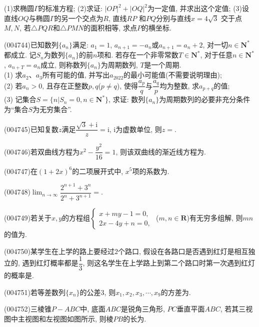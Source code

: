 (1)求椭圆$\Gamma$的标准方程;
(2)求证: ${{| OP |}^2}+{{| OQ |}^2}$为一定值, 并求出这个定值;
(3)设直线$OQ$与椭圆$\Gamma$的另一个交点为$R$, 直线$RP$ 和$PQ$分别与直线$x=4\sqrt 3$ 交于点$M,N$, 若$\triangle PQR$和$\triangle PMN$的面积相等, 求点$P$的横坐标.
\item (004744)已知数列$\{a_n\}$满足: $a_1=1$, $a_{n+1}=-a_n$或$a_{n+1}=a_n+2$, 对一切$n\in \mathbf{N}^*$都成立. 记$S_n$为数列$\{a_n\}$的前$n$项和. 若存在一个非零常数$T\in \mathbf{N}^*$, 对于任意$n\in \mathbf{N}^*$, $a_{n+T}={a_n}$成立, 则称数列$\{a_n\}$为周期数列, $T$是一个周期.\\
(1) 求$a_2$、$a_3$所有可能的值, 并写出$a_{2022}$的最小可能值(不需要说明理由);\\
(2) 若$a_n>0$, 且存在正整数$p,q$($p\ne q$), 使得$\dfrac{a_p}q$与$\dfrac{a_q}p$均为整数, 求$a_{p+q}$的值;\\
(3) 记集合$S=\{n|S_n=0,n\in \mathbf{N}^*\}$, 求证: 数列$\{a_n\}$为周期数列的必要非充分条件为``集合$S$为无穷集合''.
\item (004745)已知复数$z$满足$\dfrac{\sqrt 3+\mathrm{i}}z=\mathrm{i}$, $\mathrm{i}$为虚数单位, 则$z=$.
\item (004746)若双曲线方程为${x^2}-\dfrac{y^2}{16}=1$, 则该双曲线的渐近线方程为.
\item (004747)在$(1+2x)^6$的二项展开式中, $x^5$项的系数为.
\item (004748)$\displaystyle\lim_{n\to \infty}\dfrac{2^{n+1}+3^n}{2^n+3^{n+1}}=$.
\item (004749)若关于$x,y$的方程组$\begin{cases}  x+my-1=0,  \\ 2x-4y+n=0,  \end{cases}$ ($m,n\in \mathbf{R}$)有无穷多组解, 则$mn$的值为.
\item (004750)某学生在上学的路上要经过$2$个路口, 假设在各路口是否遇到红灯是相互独立的, 遇到红灯概率都是$\dfrac 13$, 则这名学生在上学路上到第二个路口时第一次遇到红灯的概率是.
\item (004751)若等差数列$\{x_n\}$的公差$3$, 则$x_1,x_2,x_3,\cdots,x_9$的方差为.
\item (004752)三棱锥$P-ABC$中, 底面$ABC$是锐角三角形, $PC$垂直平面$ABC$, 若其三视图中主视图和左视图如图所示, 则棱$PB$的长为.
